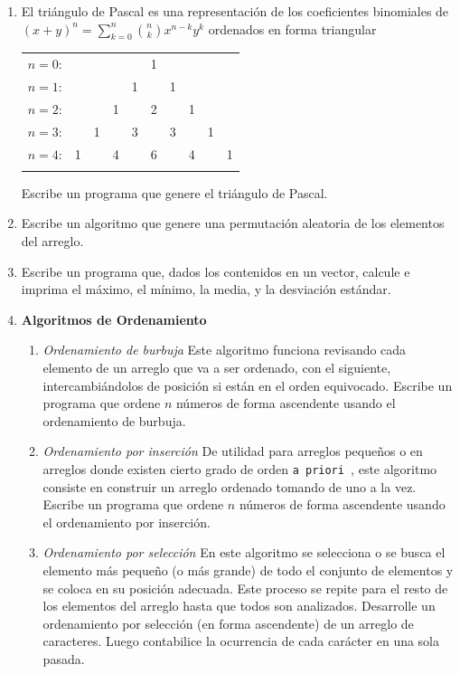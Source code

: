 \documentclass[11pt,a4paper]{article}
\newcounter{num}
\begin{document}
\begin{enumerate}
\item El tri\'angulo de Pascal es una representaci\'on de los coeficientes binomiales  de $( x+ y)^n = \sum_{ k = 0}^{n}\binom{n}{k}x^{n - k}y^{k}$   ordenados en forma triangular 


\begin{tabular}{rccccccccc}
$n=0$:&    &    &    &    &  1\\\noalign{\smallskip\smallskip}
$n=1$:&    &    &    &  1 &    &  1\\\noalign{\smallskip\smallskip}
$n=2$:&    &    &  1 &    &  2 &    &  1\\\noalign{\smallskip\smallskip}
$n=3$:&    &  1 &    &  3 &    &  3 &    &  1\\\noalign{\smallskip\smallskip}
$n=4$:&  1 &    &  4 &    &  6 &    &  4 &    &  1\\\noalign{\smallskip\smallskip}
\end{tabular}

 Escribe un programa que genere el tri\'angulo de Pascal.
 \item Escribe un algoritmo que genere una permutaci\'on aleatoria de los elementos del arreglo.
\item Escribe un programa que, dados los contenidos en un vector, calcule e imprima el m\'aximo, el m\'inimo, la media, y la desviaci\'on est\'andar.
\item \textbf{Algoritmos de Ordenamiento}

\begin{enumerate}
\item \textit{	Ordenamiento de burbuja } Este algoritmo funciona revisando cada elemento de un arreglo que va a ser ordenado, con el siguiente, intercambi\'andolos de posici\'on si est\'an en el orden equivocado. Escribe un programa que ordene $n$ n\'umeros de forma ascendente usando el ordenamiento de burbuja.
\item  \textit{	Ordenamiento por inserci\'on } De utilidad para arreglos peque\~nos o en arreglos donde existen cierto grado de orden \texttt{a priori }, este algoritmo consiste en construir un arreglo ordenado tomando de uno a la vez. Escribe un programa que ordene $n$ n\'umeros de forma ascendente usando el ordenamiento por inserci\'on.
\item  \textit{	Ordenamiento por selecci\'on } En este algoritmo se selecciona o se busca el elemento m\'as peque\~no (o m\'as grande) de todo el conjunto de elementos y se coloca en su posici\'on adecuada. Este proceso se repite para el resto de los elementos del arreglo hasta que todos son analizados. Desarrolle un ordenamiento por selecci\'on (en forma ascendente) de un arreglo de caracteres. Luego contabilice la ocurrencia de cada car\'acter en una sola pasada.


\end{enumerate}
\end{enumerate}
\end{document}
